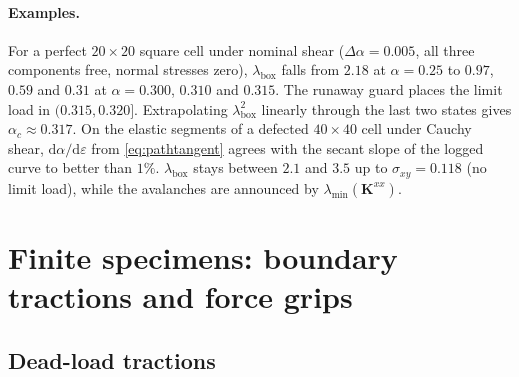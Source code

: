 \documentclass[11pt,a4paper]{article}
\begin{document}
\paragraph{Examples.}
For a perfect \(20\times20\) square cell under nominal shear (\(\Delta\alpha=0.005\), all three
components free, normal stresses zero), \(\lambda_{\mathrm{box}}\) falls from \(2.18\) at
\(\alpha=0.25\) to \(0.97\), \(0.59\) and \(0.31\) at \(\alpha=0.300\), \(0.310\) and \(0.315\). The
runaway guard places the limit load in \((0.315,0.320]\). Extrapolating \(\lambda_{\mathrm{box}}^2\)
linearly through the last two states gives \(\alpha_c\approx0.317\). On the elastic segments of a
defected \(40\times40\) cell under Cauchy shear, \(\mathrm d\alpha/\mathrm d\varepsilon\) from
\eqref{eq:pathtangent} agrees with the secant slope of the logged curve to better than \(1\%\).
\(\lambda_{\mathrm{box}}\) stays between \(2.1\) and \(3.5\) up to \(\sigma_{xy}=0.118\) (no limit
load), while the avalanches are announced by \(\lambda_{\min}(\mathbf K^{xx})\).

\section{Finite specimens: boundary tractions and force grips}
\label{sec:traction}

\subsection{Dead-load tractions}
\end{document}
